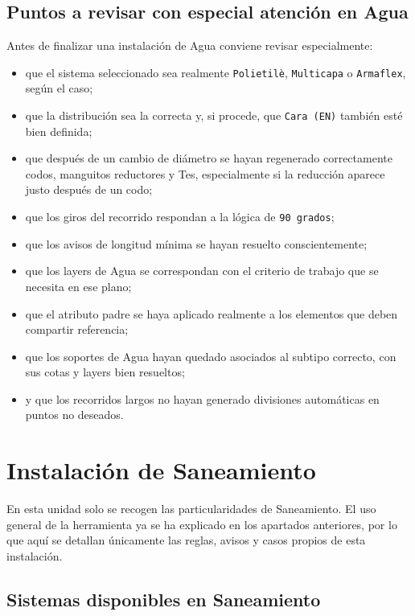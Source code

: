 \documentclass[12pt,a4paper]{article}
\begin{document}
\subsection{Puntos a revisar con especial atención en Agua}

Antes de finalizar una instalación de Agua conviene revisar especialmente:

\begin{itemize}
\item que el sistema seleccionado sea realmente \texttt{Polietilè}, \texttt{Multicapa} o \texttt{Armaflex}, según el caso;
\item que la distribución sea la correcta y, si procede, que \texttt{Cara (EN)} también esté bien definida;
\item que después de un cambio de diámetro se hayan regenerado correctamente codos, manguitos reductores y Tes, especialmente si la reducción aparece justo después de un codo;
\item que los giros del recorrido respondan a la lógica de \texttt{90 grados};
\item que los avisos de longitud mínima se hayan resuelto conscientemente;
\item que los layers de Agua se correspondan con el criterio de trabajo que se necesita en ese plano;
\item que el atributo padre se haya aplicado realmente a los elementos que deben compartir referencia;
\item que los soportes de Agua hayan quedado asociados al subtipo correcto, con sus cotas y layers bien resueltos;
\item y que los recorridos largos no hayan generado divisiones automáticas en puntos no deseados.
\end{itemize}

\section{Instalación de Saneamiento}

En esta unidad solo se recogen las particularidades de Saneamiento. El uso general de la herramienta ya se ha explicado en los apartados anteriores, por lo que aquí se detallan únicamente las reglas, avisos y casos propios de esta instalación.

\subsection{Sistemas disponibles en Saneamiento}
\end{document}

